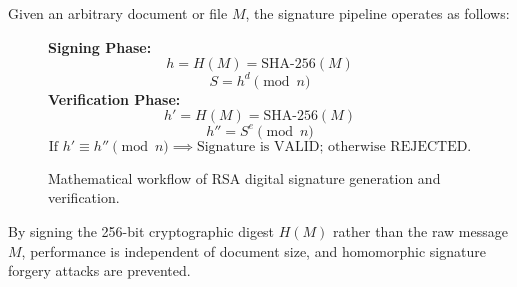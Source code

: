 \documentclass[12pt,a4paper]{article}
\begin{document}
Given an arbitrary document or file $M$, the signature pipeline operates as follows:
\begin{figure}[h!]
\centering
\begin{tcolorbox}[colback=codebg,colframe=codeframe,arc=2mm,width=0.95\textwidth]
\textbf{Signing Phase:}
\begin{equation}
    h = H(M) = \text{SHA-256}(M)
\end{equation}
\begin{equation}
    S = h^d \pmod{n}
\end{equation}
\textbf{Verification Phase:}
\begin{equation}
    h' = H(M) = \text{SHA-256}(M)
\end{equation}
\begin{equation}
    h'' = S^e \pmod{n}
\end{equation}
\begin{equation}
    \text{If } h' \equiv h'' \pmod{n} \implies \text{Signature is VALID; otherwise REJECTED.}
\end{equation}
\end{tcolorbox}
\caption{Mathematical workflow of RSA digital signature generation and verification.}
\label{fig:rsa_workflow}
\end{figure}

By signing the 256-bit cryptographic digest $H(M)$ rather than the raw message $M$, performance is independent of document size, and homomorphic signature forgery attacks are prevented.
\end{document}
